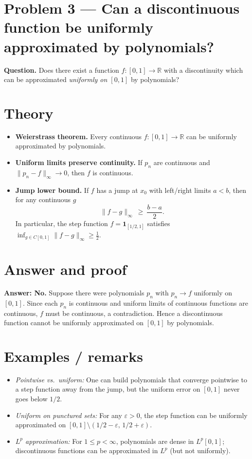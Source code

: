\documentclass[12pt,a4paper]{article}
\theoremstyle{plain}
\theoremstyle{definition}
\theoremstyle{remark}
\theoremstyle{remark}
\begin{document}
\section*{Problem 3 — Can a discontinuous function be uniformly approximated by polynomials?}

\noindent\textbf{Question.}
Does there exist a function $f:[0,1]\to\mathbb{R}$ with a discontinuity which can be approximated
\emph{uniformly on $[0,1]$} by polynomials?

\bigskip

\section*{Theory}

\begin{itemize}\setlength{\itemsep}{0.6em}
	\item \textbf{Weierstrass theorem.} Every continuous $f:[0,1]\to\mathbb{R}$ can be uniformly approximated by polynomials.
	\item \textbf{Uniform limits preserve continuity.}
	If $p_n$ are continuous and $\|p_n-f\|_\infty\to 0$, then $f$ is continuous.
	\item \textbf{Jump lower bound.} If $f$ has a jump at $x_0$ with left/right limits $a<b$, then for any continuous $g$
	\[
	\|f-g\|_\infty \ \ge\ \frac{b-a}{2}.
	\]
	In particular, the step function $f=\mathbf{1}_{[1/2,1]}$ satisfies
	$\inf_{g\in C[0,1]}\|f-g\|_\infty\ge \tfrac12$.
\end{itemize}

\bigskip

\section*{Answer and proof}

\noindent\textbf{Answer: No.}
Suppose there were polynomials $p_n$ with $p_n\to f$ uniformly on $[0,1]$.
Since each $p_n$ is continuous and uniform limits of continuous functions are continuous,
$f$ must be continuous, a contradiction. Hence a discontinuous function cannot be uniformly
approximated on $[0,1]$ by polynomials.

\bigskip

\section*{Examples / remarks}

\begin{itemize}
	\item \emph{Pointwise vs.\ uniform:} One can build polynomials that converge pointwise to a step function away from the jump, but the uniform error on $[0,1]$ never goes below $1/2$.
	\item \emph{Uniform on punctured sets:} For any $\varepsilon>0$, the step function can be uniformly approximated on $[0,1]\setminus(1/2-\varepsilon,\,1/2+\varepsilon)$.
	\item \emph{$L^p$ approximation:} For $1\le p<\infty$, polynomials are dense in $L^p[0,1]$; discontinuous functions can be approximated in $L^p$ (but not uniformly).
\end{itemize}
\end{document}
